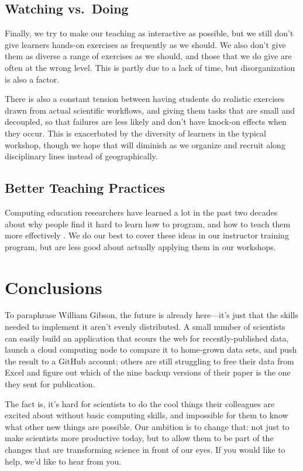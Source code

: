 \documentclass[10pt,a4paper,twocolumn]{article}
\begin{document}
\subsection*{Watching vs.~Doing}

Finally, we try to make our teaching as interactive as possible, but
we still don't give learners hands-on exercises as frequently as we
should.  We also don't give them as diverse a range of exercises as we
should, and those that we do give are often at the wrong level. This
is partly due to a lack of time, but disorganization is also a factor.

There is also a constant tension between having students do realistic
exercises drawn from actual scientific workflows, and giving them tasks
that are small and decoupled, so that failures are less likely and don't
have knock-on effects when they occur. This is exacerbated by the
diversity of learners in the typical workshop, though we hope that will
diminish as we organize and recruit along disciplinary lines instead of
geographically.

\subsection*{Better Teaching Practices}

Computing education researchers have learned a lot in the past two
decades about why people find it hard to learn how to program, and how
to teach them more effectively
\cite{guzdial2010,guzdial2013,hazzan2011,porter2013,sorva2012}.  We
do our best to cover these ideas in our instructor training program,
but are less good about actually applying them in our workshops.

\section*{Conclusions}

To paraphrase William Gibson, the future is already here---it's just
that the skills needed to implement it aren't evenly distributed. A
small number of scientists can easily build an application that scours
the web for recently-published data, launch a cloud computing node to
compare it to home-grown data sets, and push the result to a GitHub
account; others are still struggling to free their data from Excel and
figure out which of the nine backup versions of their paper is the one
they sent for publication.

The fact is, it's hard for scientists to do the cool things their
colleagues are excited about without basic computing skills, and
impossible for them to know what other new things are possible. Our
ambition is to change that: not just to make scientists more productive
today, but to allow them to be part of the changes that are transforming
science in front of our eyes. If you would like to help, we'd like to
hear from you.
\end{document}
